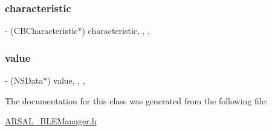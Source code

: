 \subsubsection{\texorpdfstring{characteristic}{characteristic}}
{\footnotesize\ttfamily -\/ (C\+B\+Characteristic$\ast$) characteristic\hspace{0.3cm}{\ttfamily [read]}, {\ttfamily [write]}, {\ttfamily [nonatomic]}, {\ttfamily [retain]}}

\hypertarget{interfaceARSALBLEManagerNotificationData_ad946383fc336fd155e1a1a087ee230f4}{}\label{interfaceARSALBLEManagerNotificationData_ad946383fc336fd155e1a1a087ee230f4} 
\subsubsection{\texorpdfstring{value}{value}}
{\footnotesize\ttfamily -\/ (N\+S\+Data$\ast$) value\hspace{0.3cm}{\ttfamily [read]}, {\ttfamily [write]}, {\ttfamily [nonatomic]}, {\ttfamily [retain]}}



The documentation for this class was generated from the following file\+:\begin{DoxyCompactItemize}
\item 
\hyperlink{ARSAL__BLEManager_8h}{A\+R\+S\+A\+L\+\_\+\+B\+L\+E\+Manager.\+h}\end{DoxyCompactItemize}
